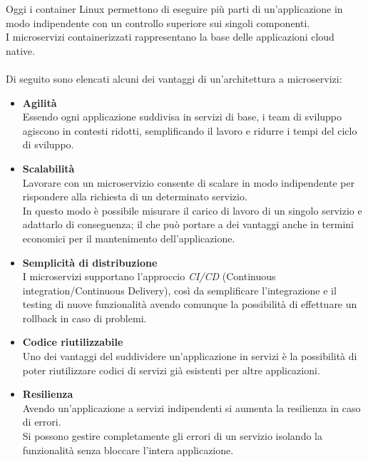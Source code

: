 Oggi i container Linux permettono di eseguire più parti di un'applicazione in modo indipendente con un controllo superiore sui singoli componenti.\\
I microservizi containerizzati rappresentano la base delle applicazioni cloud native.\\ \\
Di seguito sono elencati alcuni dei vantaggi di un’architettura a microservizi:

\begin{itemize}
	\item \textbf{Agilità}\\ Essendo ogni applicazione suddivisa in servizi di base, i team di sviluppo agiscono in contesti ridotti, semplificando il lavoro e ridurre i tempi del ciclo di sviluppo.
	\item \textbf{Scalabilità}\\Lavorare con un microservizio consente di scalare in modo indipendente per rispondere alla richiesta di un determinato servizio.\\ In questo modo è possibile misurare il carico di lavoro di un singolo servizio e adattarlo di conseguenza; il che può portare a dei vantaggi anche in termini economici per il mantenimento dell’applicazione. 
	\item \textbf{Semplicità di distribuzione}\\ I microservizi supportano l’approccio \emph{CI/CD} (Continuous integration/Continuous Delivery), così da semplificare l’integrazione e il testing di nuove funzionalità avendo comunque la possibilità di effettuare un rollback in caso di problemi.
	\item \textbf{Codice riutilizzabile}\\ Uno dei vantaggi del suddividere un’applicazione in servizi è la possibilità di poter riutilizzare codici di servizi già esistenti per altre applicazioni.
	\item \textbf{Resilienza}\\ Avendo un’applicazione a servizi indipendenti si aumenta la resilienza in caso di errori.\\ Si possono gestire completamente gli errori di un servizio isolando la funzionalità senza bloccare l’intera applicazione.
\end{itemize}

